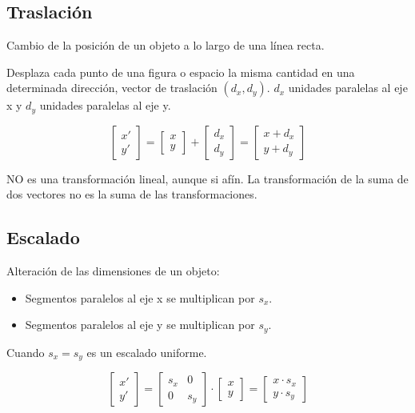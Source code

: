\subsection{Traslación}
Cambio de la posición de un objeto a lo largo de una línea recta.

Desplaza cada punto de una figura o espacio la misma cantidad en una determinada dirección, vector de traslación $(d_x,d_y)$. $d_x$ unidades paralelas al eje x y $d_y$ unidades paralelas al eje y.

$$\left[\begin{matrix}
			x' \\ y'
		\end{matrix}\right] =
	\left[\begin{matrix}
			x \\ y
		\end{matrix}\right]+
	\left[\begin{matrix}
			d_x \\ d_y
		\end{matrix}\right]=
	\left[\begin{matrix}
			x+d_x \\ y+d_y
		\end{matrix}\right]$$

NO es una transformación lineal, aunque si afín. La transformación de la suma de dos vectores no es la suma de las transformaciones.

\subsection{Escalado}
Alteración de las dimensiones de un objeto:
\begin{itemize}
	\item Segmentos paralelos al eje x se multiplican por $s_x$.
	\item Segmentos paralelos al eje y se multiplican por $s_y$.
\end{itemize}

Cuando $s_x = s_y$ es un escalado uniforme.

$$\left[\begin{matrix}
			x' \\ y'
		\end{matrix}\right] =
	\left[\begin{matrix}
			s_x & 0 \\ 0 & s_y
		\end{matrix}\right] \cdot
	\left[\begin{matrix}
			x \\ y
		\end{matrix}\right]=
	\left[\begin{matrix}
			x\cdot s_x \\ y\cdot s_y
		\end{matrix}\right]$$

